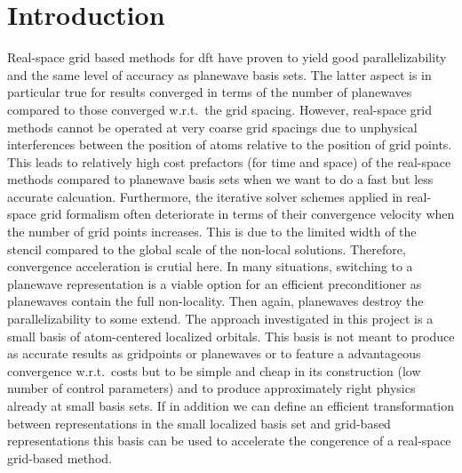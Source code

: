 \documentclass[oribibl]{llncs}
\begin{document}
\section{Introduction} \label{sec:intro}
%
Real-space grid based methods for \ac{dft}
have proven to yield good parallelizability and the same level of
accuracy as \ac{planewave} basis sets.
The latter aspect is in particular true for results converged
in terms of the number of \acp{planewave} compared to those converged
w.r.t.~the grid spacing.
However, real-space grid methods cannot be operated at very coarse
grid spacings due to unphysical interferences between the position
of atoms relative to the position of grid points.
This leads to relatively high cost prefactors (for time and space)
of the real-space methods compared to \ac{planewave} basis sets
when we want to do a fast but less accurate calcuation.
Furthermore, the iterative solver schemes applied in real-space
grid formalism often deteriorate in terms of their convergence
velocity when the number of grid points increases.
This is due to the limited width of the stencil compared to the 
global scale of the non-local solutions.
Therefore, convergence acceleration is crutial here.
In many situations, switching to a \ac{planewave} representation
is a viable option for an efficient preconditioner as
\acp{planewave} contain the full non-locality.
Then again, \acp{planewave} destroy the parallelizability
to some extend.
The approach investigated in this project is a small basis of atom-centered
localized orbitals.
This basis is not meant to produce as accurate results as \acp{gridpoint} or \acp{planewave}
or to feature a advantageous convergence w.r.t.~costs
but to be simple and cheap in its construction (low number of control parameters)
and to produce approximately right physics already at small basis sets.
If in addition we can define an efficient transformation between
representations in
the small localized basis set and grid-based representations
this basis can be used to accelerate
the congerence of a real-space grid-based method.

\end{document}
